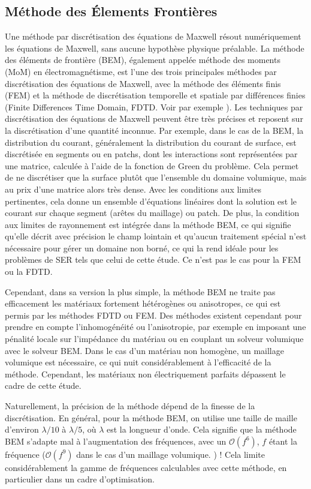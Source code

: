 \subsection{Méthode des \'Elements Frontières}

Une méthode par discrétisation des équations de Maxwell résout numériquement les équations de Maxwell, sans aucune hypothèse physique préalable.
La méthode des éléments de frontière (BEM), également appelée méthode des moments (MoM) en électromagnétisme, est l'une des trois principales méthodes par discrétisation des équations de Maxwell, avec la méthode des éléments finis (FEM) et la  méthode de discrétisation temporelle et spatiale par différences finies (Finite Differences Time Domain, FDTD. Voir par exemple \cite{Teixeira2023}). Les techniques par discrétisation des équations de Maxwell peuvent être très précises et reposent sur la discrétisation d'une quantité inconnue. Par exemple, dans le cas de la BEM, la distribution du courant, généralement la distribution du courant de surface, est discrétisée en segments ou en patchs, dont les interactions sont représentées par une matrice, calculée à l'aide de la fonction de Green du problème. Cela permet de ne discrétiser que la surface plutôt que l'ensemble du domaine volumique, mais au prix d'une matrice alors très dense. Avec les conditions aux limites pertinentes, cela donne un ensemble d'équations linéaires dont la solution est le courant sur chaque segment (arêtes du maillage) ou patch. De plus, la condition aux limites de rayonnement est intégrée dans la méthode BEM, ce qui signifie qu'elle décrit avec précision le champ lointain et qu'aucun traitement spécial n'est nécessaire pour gérer un domaine non borné, ce qui la rend idéale pour les problèmes de SER tels que celui de cette étude. Ce n'est pas le cas pour la FEM ou la FDTD.

Cependant, dans sa version la plus simple, la méthode BEM ne traite pas efficacement les matériaux fortement hétérogènes ou anisotropes, ce qui est permis par les méthodes FDTD ou FEM. Des méthodes existent cependant pour prendre en compte l'inhomogénéité ou l'anisotropie, par exemple en imposant une pénalité locale sur l'impédance du matériau ou en couplant un solveur volumique avec le solveur BEM. Dans le cas d'un matériau non homogène, un maillage volumique est nécessaire, ce qui nuit considérablement à l'efficacité de la méthode. Cependant, les matériaux non électriquement parfaits dépassent le cadre de cette étude.

Naturellement, la précision de la méthode dépend de la finesse de la discrétisation. En général, pour la méthode BEM, on utilise une taille de maille d'environ $\lambda/10$ à $\lambda/5$, où $\lambda$ est la longueur d'onde. Cela signifie que la méthode BEM s'adapte mal à l'augmentation des fréquences, avec un $\mathcal{O}\left(f^6\right)$, $f$ étant la fréquence ($\mathcal{O}\left(f^9\right)$ dans le cas d'un maillage volumique. \citep{Davidson2010}) ! Cela limite considérablement la gamme de fréquences calculables avec cette méthode, en particulier dans un cadre d'optimisation.

